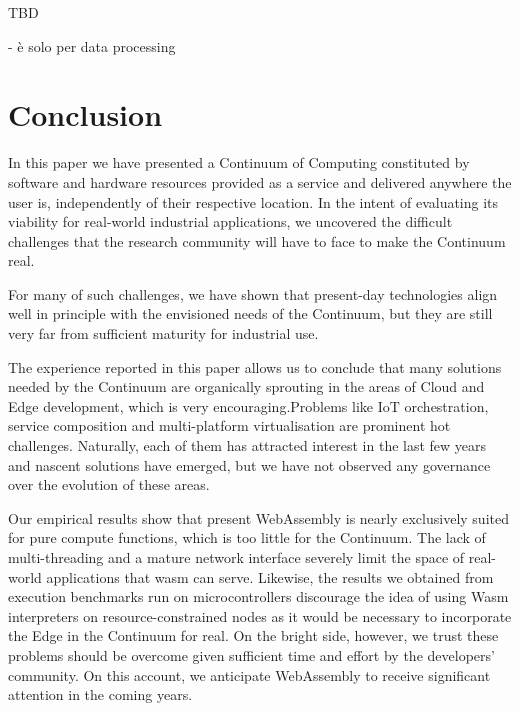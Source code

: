TBD

- \cite{abdelbaky2017computing} è solo per data processing

\section{Conclusion}
\label{sec:conclusion}

In this paper we have presented a Continuum of Computing constituted by software and hardware resources provided as a service and delivered anywhere the user is, independently of their respective location. 
In the intent of evaluating its viability for real-world industrial applications, we uncovered the difficult challenges that the research community will have to face to make the Continuum real. 

For many of such challenges, we have shown that present-day technologies align well in principle with the envisioned needs of the Continuum, but they are still very far from sufficient maturity for industrial use.


The experience reported in this paper allows us to conclude that many solutions needed by the Continuum are organically sprouting in the areas of Cloud and Edge development, which is very encouraging.Problems like IoT orchestration, service composition and multi-platform virtualisation are prominent hot challenges. Naturally, each of them has attracted interest in the last few years and nascent solutions have emerged, but we have not observed any governance over the evolution of these areas.

Our empirical results show that present WebAssembly is nearly exclusively suited for pure compute functions, which is too little for the Continuum. The lack of multi-threading and a mature network interface severely limit the space of real-world applications that wasm can serve.
Likewise, the results we obtained from execution benchmarks run on microcontrollers discourage the idea of using Wasm interpreters on resource-constrained nodes as it would be necessary to incorporate the Edge in the Continuum for real. 
On the bright side, however, we trust these problems should be overcome given sufficient time and effort by the developers' community. On this account, we anticipate WebAssembly to receive significant attention in the coming years.

